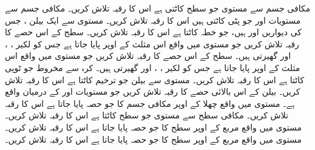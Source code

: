 مکافی جسم  سے مستوی   جو  سطح  کاٹتی ہے اس  کا رقبہ تلاش کریں۔
مکافی جسم  سے مستویات  اور    جو   پٹی کاٹتی ہیں  اس  کا رقبہ تلاش کریں۔
مستوی  سے ایک بیلن ، جس کی دیواریں  اور  ہیں،  جو خطہ کاٹتا ہے اس کا رقبہ تلاش کریں۔
سطح  کے اس حصے کا رقبہ تلاش کریں جو مستوی   میں واقع  اس مثلث  کے اوپر پایا جاتا ہے جس کو لکیر ، ، اور   گھیرتی ہیں۔
سطح  کے اس حصے کا رقبہ تلاش کریں جو مستوی   میں واقع  اس مثلث  کے اوپر پایا جاتا ہے جس کو لکیر ،  ، اور   گھیرتی ہیں۔
کرہ  سے مخروط   جو ٹوپی کاٹتا ہے اس کا رقبہ تلاش کریں۔
مستوی  سے  بیلن    جو  ترخیم کاٹتا ہے اس کا رقبہ تلاش کریں۔
بیلن  کے اس بالائی حصے کا رقبہ تلاش کریں جو  مستویات  اور  کے درمیان واقع ہے۔
مستوی  میں واقع    چھلا   کے اوپر مکافی جسم    کا جو حصہ پایا جاتا ہے اس کا رقبہ تلاش کریں۔
مکافی سطح  سے مستوی   جو سطح کاٹتا ہے اس کا رقبہ تلاش کریں۔
مستوی  میں واقع مربع  کے اوپر سطح   کا جو حصہ پایا جاتا ہے اس کا رقبہ تلاش کریں۔
مستوی  میں واقع مربع  کے اوپر سطح      کا جو حصہ پایا جاتا ہے اس کا رقبہ تلاش کریں۔

